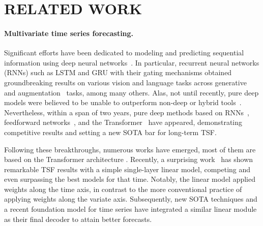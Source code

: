 \section{RELATED WORK}
\label{sec:related}

\paragraph{Multivariate time series forecasting.} Significant efforts have been dedicated to modeling and predicting sequential information using deep neural networks~\cite{goodfellow2016deep}. In particular, recurrent neural networks (RNNs) such as LSTM and GRU with their gating mechanisms obtained groundbreaking results on various vision and language tasks \cite{hochreiter1997long, cho2014learning} across generative~\cite{naiman2024generative, naiman2024utilizing, ren2024learning} and augmentation~\cite{kaufman2024first, nochumsohn2024beyond} tasks, among many others. Alas, not until recently, pure deep models were believed to be unable to outperform non-deep or hybrid tools~\cite{oreshkin2020nbeats}. Nevertheless, within a span of two years, pure deep methods based on RNNs~\cite{salinas2020deepar}, feedforward networks~\cite{oreshkin2020nbeats}, and the Transformer~\cite{zhou2021informer} have appeared, demonstrating competitive results and setting a new SOTA bar for long-term TSF.

Following these breakthroughs, numerous works have emerged, most of them are based on the Transformer architecture \cite{wu2021autoformer, zhou2022fedformer, zhang2022crossformer}. Recently, a surprising work~\cite{zeng2023Transformers} has shown remarkable TSF results with a simple single-layer linear model, competing and even surpassing the best models for that time. Notably, the linear model applied weights along the time axis, in contrast to the more conventional practice of applying weights along the variate axis. Subsequently, new SOTA techniques \cite{nie2023time, xue2023make} and a recent foundation model for time series \cite{zhou2023one} have integrated a similar linear module as their final decoder to attain better forecasts.


